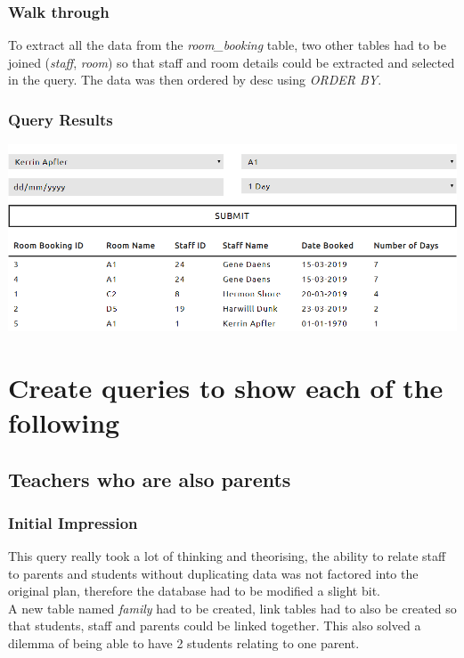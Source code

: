 \documentclass{article}
\begin{document}
\subsubsection{Walk through} To extract all the data from the \textit{room\_booking} table, two other tables had to be joined (\textit{staff}, \textit{room}) so that staff and room details could be extracted and selected in the query. The data was then ordered by \acrfull{desc} using \textit{ORDER BY}.

\subsubsection{Query Results}
\includegraphics[width=\linewidth]{images/06.png}

\newpage

\section{Create queries to show each of the following}

\subsection{Teachers who are also parents}
\subsubsection{Initial Impression} This query really took a lot of thinking and theorising, the ability to relate staff to parents and students without duplicating data was not factored into the original plan, therefore the database had to be modified a slight bit.
\\\newline
A new table named \textit{family} had to be created, link tables had to also be created so that students, staff and parents could be linked together. This also solved a dilemma of being able to have 2 students relating to one parent.
\end{document}
